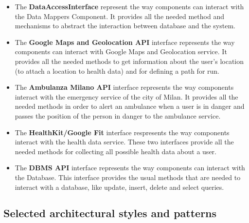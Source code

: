 \documentclass[12pt]{article}
\begin{document}
\begin{itemize}
    \item  The \textbf{DataAccessInterface} represent the way components can interact with the Data Mappers Component. It provides all the needed method and mechanisms to abstract the interaction between database and the system. 
    \item The \textbf{Google Maps and Geolocation API} interface represents the way components can interact with Google Maps and Geolocation service. It provides all the needed methods to get information about the user's location (to attach a location to health data) and for defining a path for run. 
    \item The \textbf{Ambulanza Milano API} interface represents the way components interact with the emergency service of the city of Milan. It provides all the needed methods in order to alert an ambulance when a user is in danger and passes the position of the person in danger to the ambulance service.
    \item The \textbf{HealthKit/Google Fit} interface respresents the way components interact with the health data  service. These two interfaces provide all the needed methods for collecting all possible health data about a user. 
    \item The \textbf{DBMS API} interface represents the way components can interact with the Database. This interface provides the usual methods that are needed to interact with a database, like update, insert, delete and select queries.

\end{itemize}


\subsection{Selected architectural styles and patterns}
\end{document}
